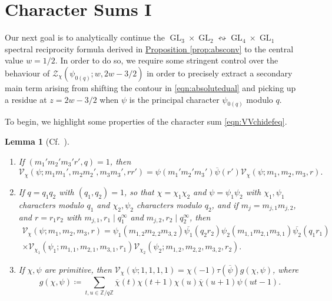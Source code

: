 \documentclass[11pt,a4paper]{amsart}
\newcommand{\VV}{\mathcal{V}}
\newcommand{\Z}{\mathbb{Z}}
\newcommand{\ZZ}{\mathcal{Z}}
\DeclareMathOperator{\GL}{GL}
\numberwithin{equation}{section}
\newtheorem{lemma}[equation]{Lemma}
\theoremstyle{remark}
\theoremstyle{definition}
\begin{document}
\section{Character Sums I}
\label{sect:charsumsI}

Our next goal is to analytically continue the $\GL_3 \times \GL_2 \leftrightsquigarrow \GL_4 \times \GL_1$ spectral reciprocity formula derived in \hyperref[prop:absconv]{Proposition \ref*{prop:absconv}} to the central value $w = 1/2$. In order to do so, we require some stringent control over the behaviour of $\ZZ_{\chi}(\psi_{0(q)};w,2w - 3/2)$ in order to precisely extract a secondary main term arising from shifting the contour in \eqref{eqn:absolutedual} and picking up a residue at $z = 2w - 3/2$ when $\psi$ is the principal character $\psi_{0(q)}$ modulo $q$.

To begin, we highlight some properties of the character sum \eqref{eqn:VVchidefeq}.

\begin{lemma}[Cf.~{\cite[Section 5.2]{PY20}}]\hspace{1em}
\label{lem:VVchiproperties}
\begin{enumerate}[leftmargin=*,label=\textup{(\arabic*)}]
\item\label{lemno:VVchicoprime} If $(m_1' m_2' m_3' r',q) = 1$, then
\[\VV_{\chi}(\psi;m_1 m_1',m_2 m_2',m_3 m_3',r r') = \psi(m_1' m_2' m_3') \overline{\psi}(r') \VV_{\chi}(\psi;m_1,m_2,m_3,r).\]
\item\label{lemno:VVchimult} If $q = q_1 q_2$ with $(q_1,q_2) = 1$, so that $\chi = \chi_1 \chi_2$ and $\psi = \psi_1 \psi_2$ with $\chi_1,\psi_1$ characters modulo $q_1$ and $\chi_2,\psi_2$ characters modulo $q_2$, and if $m_j = m_{j,1} m_{j,2}$, and $r = r_1 r_2$ with $m_{j,1},r_1 \mid q_1^{\infty}$ and $m_{j,2}, r_2 \mid q_2^{\infty}$, then
\begin{multline*}
\VV_{\chi}(\psi;m_1,m_2,m_3,r) = \psi_1(m_{1,2} m_{2,2} m_{3,2}) \overline{\psi_1}(q_2 r_2) \psi_2(m_{1,1} m_{2,1} m_{3,1}) \overline{\psi_2}(q_1 r_1)	\\
\times \VV_{\chi_1}(\psi_1;m_{1,1},m_{2,1},m_{3,1},r_1) \VV_{\chi_2}(\psi_2;m_{1,2},m_{2,2},m_{3,2},r_2).
\end{multline*}
\item\label{lemno:VVchig} If $\chi,\psi$ are primitive, then $\VV_{\chi}(\psi;1,1,1,1) = \chi(-1) \tau(\overline{\psi}) g(\chi,\psi)$, where
\begin{equation}
\label{eqn:gchipsidefeq}
g(\chi,\psi) \coloneqq \sum_{t,u \in \Z/q\Z} \overline{\chi}(t) \chi(t + 1) \chi(u) \overline{\chi}(u + 1) \psi(ut - 1).
\end{equation}
\end{enumerate}
\end{lemma}
\end{document}
